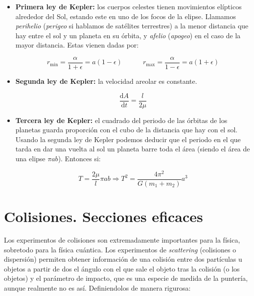 \documentclass[12pt,a4paper]{book}
\newcommand{\D}{\mathrm{d}}
\begin{document}
\begin{itemize}
\item \textbf{Primera ley de Kepler:} los cuerpos celestes tienen movimientos elípticos alrededor del Sol, estando este en uno de los focos de la elipse. Llamamos \textit{perihelio} (\textit{perigeo} si hablamos de satélites terrestres) a la menor distancia que hay entre el sol y un planeta en su órbita, y \textit{afelio} (\textit{apogeo}) en el caso de la mayor distancia. Estas vienen dadas por:

\begin{equation}
r_{\mathrm{min}} = \dfrac{\alpha}{1+ \epsilon} = a (1 - \epsilon)  \quad \quad \quad
r_{\mathrm{max}} = \dfrac{\alpha}{1- \epsilon} = a (1 + \epsilon)
\end{equation}

\item \textbf{Segunda ley de Kepler:} la velocidad areolar es constante.

\begin{equation}
\dfrac{\D A}{\D t} = \dfrac{l}{2 \mu}
\end{equation}

\item \textbf{Tercera ley de Kepler:} el cuadrado del periodo de las órbitas de los planetas guarda proporción con el cubo de la distancia que hay con el sol. Usando la segunda ley de Kepler podemos deducir que el periodo en el que tarda en dar una vuelta al sol un planeta barre toda el área (siendo el área de una elipse $\pi a b$). Entonces si:

\begin{equation}
T = \dfrac{2 \mu}{l} \pi a b \Longrightarrow T^2 = \dfrac{4 \pi^2}{G (m_1 + m_2)} a^3
\end{equation}

\end{itemize}

\section{Colisiones. Secciones eficaces}

Los experimentos de colisiones son extremadamente importantes para la física, sobretodo para la física cuántica. Los experimentos de \textit{scattering} (colisiones o dispersión) permiten obtener información de una colisión entre dos partículas u objetos a partir de dos el ángulo con el que sale el objeto tras la colisión (o los objetos) y el parámetro de impacto, que es una especie de medida de la puntería, aunque realmente no es así. Definiendolos de manera rigurosa:
\end{document}
